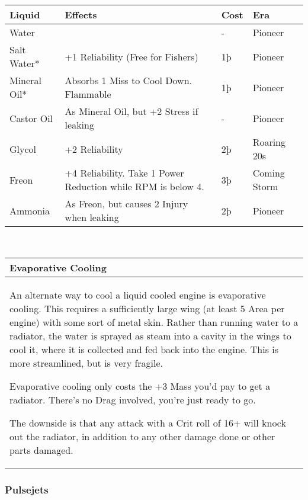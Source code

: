 \documentclass{article}
\begin{document}
\begin{tabular}{|l|l|l|l|}
  \hline
  Liquid       & Effects                                                      & Cost & Era         \\\hline
  Water        &                                                              & -    & Pioneer     \\\hline
  Salt Water*  & +1 Reliability (Free for Fishers)                            & 1þ   & Pioneer     \\\hline
  Mineral Oil* & Absorbs 1 Miss to Cool Down. Flammable                       & 1þ   & Pioneer     \\\hline
  Castor Oil   & As Mineral Oil, but +2 Stress if leaking                     & -    & Pioneer     \\\hline
  Glycol       & +2 Reliability                                               & 2þ   & Roaring 20s \\\hline
  Freon        & +4 Reliability. Take 1 Power Reduction while RPM is below 4. &
  3þ           & Coming Storm                                                                      \\\hline
  Ammonia      & As Freon, but causes 2 Injury when leaking                   & 2þ   & Pioneer     \\\hline
\end{tabular}
\\
\begin{tabular}{|l|}
  \hline
  Evaporative Cooling \\\hline

  An alternate way to cool a liquid cooled engine is evaporative cooling.
  This requires a sufficiently large wing (at least 5 Area per engine)
  with some sort of metal skin. Rather than running water to a radiator,
  the water is sprayed as steam into a cavity in the wings to cool it,
  where it is collected and fed back into the engine. This is more
  streamlined, but is very fragile.

  Evaporative cooling only costs the +3 Mass you'd pay to get a radiator.
  There's no Drag involved, you're just ready to go.

  The downside is that any attack with a Crit roll of 16+ will knock out
  the radiator, in addition to any other damage done or other parts
  damaged.            \\\hline
\end{tabular}

\subsubsection{Pulsejets}
\label{_Pulsejets}
\end{document}

